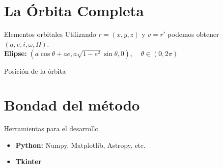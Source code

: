 \documentclass{beamer}
\begin{document}
\section{La Órbita Completa}
\begin{frame}{Elementos orbitales}
Utilizando $r=(x,y,z)$ y $v=r'$ podemos obtener $(a,e,i,\omega,\Omega)$.\\
\pause
\vspace{1cm}
\textbf{Elipse:}
\hspace{0.75cm}
$
(a\cos{\theta}+ae, a\sqrt{1-e^2}\sin{\theta}, 0), \; \; \; \; \theta\in(0,2\pi)
$
\end{frame}


\begin{frame}{Posición de la órbita}

\end{frame}

\section{Bondad del método}

\begin{frame}{Herramientas para el desarrollo}
\begin{itemize}
\item \textbf{Python:} Numpy, Matplotlib, Astropy, etc.
\item \textbf{Tkinter}
\end{itemize}
\end{frame}
\end{document}
